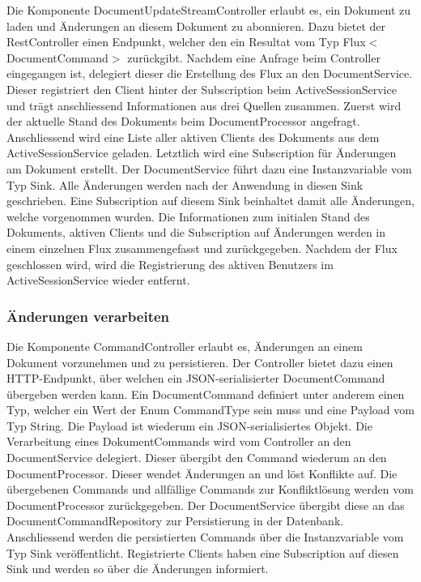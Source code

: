 Die Komponente DocumentUpdateStreamController erlaubt es, ein Dokument zu laden und Änderungen an diesem Dokument zu abonnieren.
Dazu bietet der RestController einen Endpunkt, welcher den ein Resultat vom Typ Flux$<$DocumentCommand$>$ zurückgibt.
Nachdem eine Anfrage beim Controller eingegangen ist, delegiert dieser die Erstellung des Flux an den DocumentService.
Dieser registriert den Client hinter der Subscription beim ActiveSessionService und trägt anschliessend Informationen aus drei Quellen zusammen.
Zuerst wird der aktuelle Stand des Dokuments beim DocumentProcessor angefragt.
Anschliessend wird eine Liste aller aktiven Clients des Dokuments aus dem ActiveSessionService geladen.
Letztlich wird eine Subscription für Änderungen am Dokument erstellt.
Der DocumentService führt dazu eine Instanzvariable vom Typ Sink.
Alle Änderungen werden nach der Anwendung in diesen Sink geschrieben.
Eine Subscription auf diesem Sink beinhaltet damit alle Änderungen, welche vorgenommen wurden.
Die Informationen zum initialen Stand des Dokuments, aktiven Clients und die Subscription auf Änderungen werden in einem einzelnen Flux zusammengefasst und zurückgegeben.
Nachdem der Flux geschlossen wird, wird die Registrierung des aktiven Benutzers im ActiveSessionService wieder entfernt.

\subsubsection{Änderungen verarbeiten}

Die Komponente CommandController erlaubt es, Änderungen an einem Dokument vorzunehmen und zu persistieren.
Der Controller bietet dazu einen HTTP-Endpunkt, über welchen ein JSON-serialisierter DocumentCommand übergeben werden kann.
Ein DocumentCommand definiert unter anderem einen Typ, welcher ein Wert der Enum CommandType sein muss und eine Payload vom Typ String.
Die Payload ist wiederum ein JSON-serialisiertes Objekt.
Die Verarbeitung eines DokumentCommands wird vom Controller an den DocumentService delegiert.
Dieser übergibt den Command wiederum an den DocumentProcessor.
Dieser wendet Änderungen an und löst Konflikte auf.
Die übergebenen Commands und allfällige Commands zur Konfliktlösung werden vom DocumentProcessor zurückgegeben.
Der DocumentService übergibt diese an das DocumentCommandRepository zur Persistierung in der Datenbank.
Anschliessend werden die persistierten Commands über die Instanzvariable vom Typ Sink veröffentlicht.
Registrierte Clients haben eine Subscription auf diesen Sink und werden so über die Änderungen informiert.

